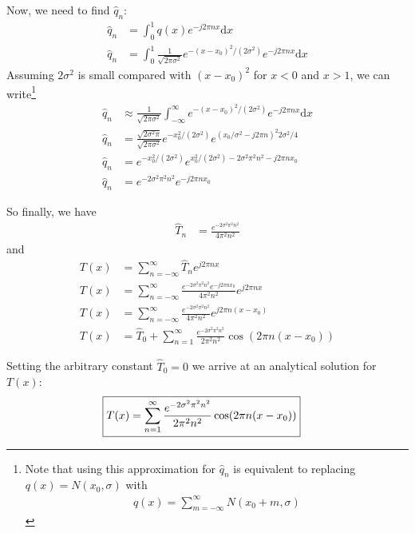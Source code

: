 \documentclass[twocolumn]{myarticle}
\renewcommand{\d}{\mathrm{d}}
\begin{document}
Now, we need to find $ \hat{q}_n $:
\begin{align}
    \hat{q}_n &= \int_{0}^{1} q(x) e^{-j 2 \pi n x} \d x
    \\
    \hat{q}_n &= \int_{0}^{1} \frac{1}{\sqrt{2 \pi \sigma^2}} e^{-(x - x_0)^2/(2 \sigma^2)} e^{-j 2 \pi n x} \d x
\end{align}
Assuming $ 2 \sigma^2 $ is small compared with $ (x - x_0)^2 $ for $ x < 0 $ and $ x > 1 $, we can write\footnote{Note that using this approximation for $ \hat{q}_n $ is equivalent to replacing $ q(x) = N(x_0, \sigma) $ with \begin{align}q(x) = \sum_{m=-\infty}^{\infty} N(x_0 + m, \sigma) \nonumber \end{align}}
\begin{align}
    \hat{q}_n &\approx \frac{1}{\sqrt{2 \pi \sigma^2}} \int_{-\infty}^{\infty} e^{-(x - x_0)^2/(2 \sigma^2)} e^{-j 2 \pi n x} \d x
    \\
    \hat{q}_n &= \frac{\sqrt{2 \sigma^2 \pi}}{\sqrt{2 \pi \sigma^2}} e^{-x_0^2/(2\sigma^2)} e^{(x_0/\sigma^2 - j 2 \pi n  )^2 2 \sigma^2 / 4}
    \\
    \hat{q}_n &= e^{-x_0^2/(2\sigma^2)} e^{x_0^2/(2\sigma^2) - 2 \sigma^2 \pi^2 n^2 - j 2 \pi n x_0 }
    \\
    \hat{q}_n &= e^{- 2 \sigma^2 \pi^2 n^2} e^{- j 2 \pi n x_0 }
\end{align}

So finally, we have
\begin{align}
    \hat{T}_n &= \frac{e^{-2 \sigma^2 \pi^2 n^2}}{4 \pi^2 n^2}
\end{align}
and
\begin{align}
    T(x) &= \sum_{n=-\infty}^{\infty} \hat{T}_n e^{j 2 \pi n x} 
    \\
    T(x) &= \sum_{n=-\infty}^{\infty} \frac{e^{-2 \sigma^2 \pi^2 n^2} e^{- j 2 \pi n x_0 } }{4 \pi^2 n^2} e^{j 2 \pi n x}
    \\
    T(x) &= \sum_{n=-\infty}^{\infty} \frac{e^{-2 \sigma^2 \pi^2 n^2}}{4 \pi^2 n^2} e^{j 2 \pi n (x-x_0)}
    \\
    T(x) &= \hat{T}_0 + \sum_{n=1}^{\infty} \frac{e^{-2 \sigma^2 \pi^2 n^2}}{2 \pi^2 n^2} \cos(2 \pi n (x-x_0)) 
\end{align}

Setting the arbitrary constant $ \hat{T}_0 = 0 $ we arrive at an analytical solution for $ T(x) $:
\begin{align}
    \Aboxed{T(x) &= \sum_{n=1}^{\infty} \frac{e^{-2 \sigma^2 \pi^2 n^2}}{2 \pi^2 n^2} \cos(2 \pi n (x-x_0))}
\end{align}
\end{document}
